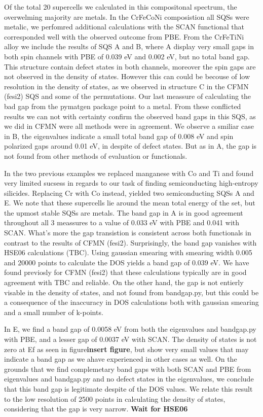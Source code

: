 Of the total 20 supercells we calculated in this compositonal spectrum, the overwelming majority are metals. In the CrFeCoNi composistion all SQSs were metalic, we perfomred additional calculations with the SCAN functional that corresponded well with the observed outcome from PBE. From the CrFeTiNi alloy we include the results of SQS A and B, where A display very small gaps in both spin channels with PBE of 0.039 eV and 0.002 eV, but no total band gap. This structure contain defect states in both channels, moreover the spin gaps are not observed in the density of states. However this can could be becouse of low resolution in the density of states, as we observed in structure C in the CFMN (fesi2) SQS and some of the permutations. Our last meassure of calculating the bad gap from the pymatgen package point to a metal. From these conflicted results we can not with certainty confirm the observed band gaps in this SQS, as we did in CFMN were all methods were in agreement.  We observe a smiliar case in B, the eigenvalues indicate a small total band gap of 0.008 eV and spin polarized gaps around 0.01 eV, in despite of defect states. But as in A, the gap is not found from other methods of evaluation or functionals. 

In the two previous examples we replaced manganese with Co and Ti and found very limited sucsess in regards to our task of finding semiconducting high-entropy silicides. Replacing Cr with Co instead, yielded two semiconducting SQSs A and E. We note that these supercells lie around the mean total energy of the set, but the upmost stable SQSs are metals. The band gap in A is in good agreement throughout all 3 meassures to a value of 0.033 eV with PBE and 0.041 with SCAN. What's more the gap transistion is consistent across both functionals in contrast to the results of  CFMN (fesi2). Surprisingly, the band gap vanishes with HSE06 calculations (TBC). Using gaussian smearing with smearing width 0.005 and 20000 points to calculate the DOS yields a band gap of 0.039 eV. We have found previosly for CFMN (fesi2) that these calculations typically are in good agreement with TBC and reliable. On the other hand, the gap is not entierly visable in the density of states, and not found from bandgap.py, but this could be a consequence of the inaccuracy in DOS calculations both with gaussian smearing and a small number of k-points.

In E, we find a band gap of 0.0058 eV from both the eigenvalues and bandgap.py with PBE, and a lesser gap of 0.0037 eV with SCAN. The density of states is not zero at Ef as seen in figure\textbf{insert figure}, but show very small values that may indicate a band gap as we ahave experienced in other cases as well. On the grounds that we find complemetary band gaps with both SCAN and PBE from eigenvalues and bandgap.py and no defect states in the eigenvalues, we conclude that this band gap is legitimate despite of the DOS values. We relate this result to the low resolution of 2500 points in calculating the density of states, considering that the gap is very narrow. \textbf{Wait for HSE06}

